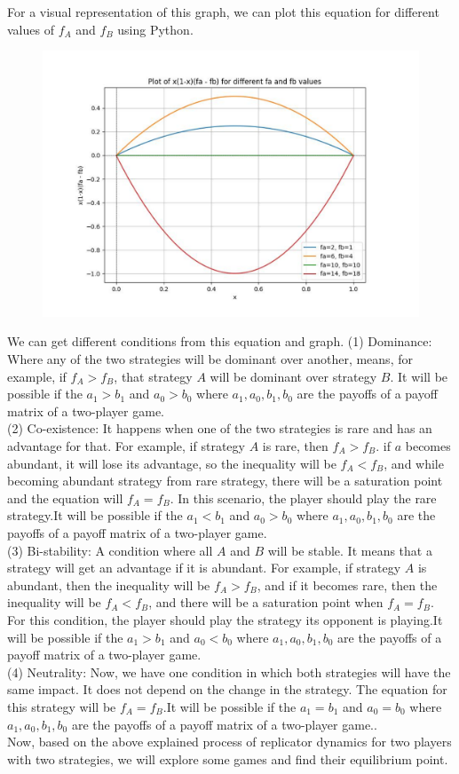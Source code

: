 \documentclass{article}
\begin{document}
For a visual representation of this graph, we can plot this equation for different values of $f_A$ and $f_B$ using Python.
\begin{figure}[h]
        \centering
        \includegraphics[width=0.5\linewidth]{Figure_1.pdf}
        \label{fig:Visualization of $x_a(1-x_a)(f_a-f_b)=0$}
    \end{figure}
We can get different conditions from this equation and graph. 
(1) Dominance: Where any of the two strategies will be dominant over another, means, for example, if $f_A>f_B$, that strategy $A$ will be dominant over strategy $B$. It will be possible if the $a_1>b_1$ and $a_0>b_0$ where $a_1,a_0,b_1,b_0$ are the payoffs of a payoff matrix of a two-player game.\\
(2) Co-existence: It happens when one of the two strategies is rare and has an advantage for that. For example, if strategy $A$ is rare, then $f_A>f_B$. if $a$ becomes abundant, it will lose its advantage, so the inequality will be  $f_A<f_B$, and while becoming abundant strategy from rare strategy, there will be a saturation point and the equation will $f_A=f_B$. In this scenario, the player should play the rare strategy.It will be possible if the $a_1<b_1$ and $a_0>b_0$ where $a_1,a_0,b_1,b_0$ are the payoffs of a payoff matrix of a two-player game.\\
(3) Bi-stability: A condition where all $A$ and $B$ will be stable. It means that a strategy will get an advantage if it is abundant. For example, if strategy $A$ is abundant, then the inequality will be $f_A>f_B$, and if it becomes rare, then the inequality will be $f_A<f_B$, and there will be a saturation point when $f_A=f_B$. For this condition, the player should play the strategy its opponent is playing.It will be possible if the $a_1>b_1$ and $a_0<b_0$ where $a_1,a_0,b_1,b_0$ are the payoffs of a payoff matrix of a two-player game.\\
(4) Neutrality: Now, we have one condition in which both strategies will have the same impact. It does not depend on the change in the strategy. The equation for this strategy will be $f_A=f_B$.It will be possible if the $a_1=b_1$ and $a_0=b_0$ where $a_1,a_0,b_1,b_0$ are the payoffs of a payoff matrix of a two-player game.\cite{Gokhale2011}.\\
Now, based on the above explained process of replicator dynamics for two players with two strategies, we will explore some games and find their equilibrium point.\\
\end{document}

